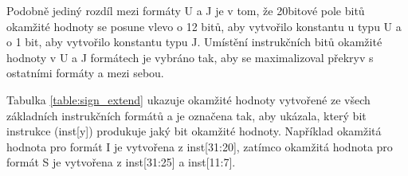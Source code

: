 \documentclass[FM,BP]{tulthesis}
\begin{document}
Podobně jediný rozdíl mezi formáty U a J je v tom, že 20bitové pole bitů okamžité hodnoty se posune vlevo o 12 bitů, aby vytvořilo konstantu u typu U a o 1 bit, aby vytvořilo konstantu typu J. Umístění instrukčních bitů okamžité hodnoty v U a J formátech je vybráno tak, aby se maximalizoval překryv s ostatními formáty a mezi sebou.

Tabulka \ref{table:sign_extend} ukazuje okamžité hodnoty vytvořené ze všech základních instrukčních formátů a je označena tak, aby ukázala, který bit instrukce (inst[y]) produkuje jaký bit okamžité hodnoty. Například okamžitá hodnota pro formát I je vytvořena z inst[31:20], zatímco okamžitá hodnota pro formát S je vytvořena z inst[31:25] a inst[11:7].

\begin{table}[h]
    \begin{center}
    \caption{Znaménkové rozšíření immediate instrukcí (převzato z \cite{RISC-V})}
    \label{table:sign_extend}
    \end{center}
\end{table}
\end{document}
